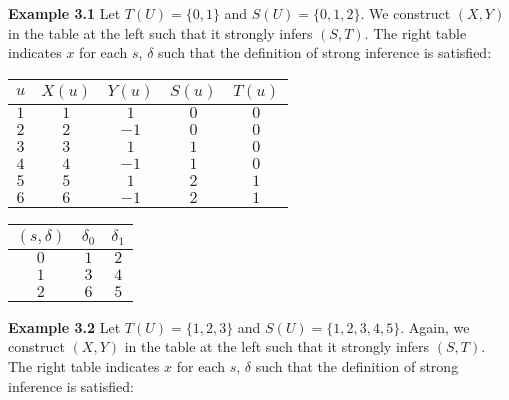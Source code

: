 \documentclass[11pt]{article}
\begin{document}
 
 \textbf{Example 3.1} \quad Let $ T(U) = \{0 , 1\} $ and $ S(U) = \{0, 1, 2\} $. We construct $ (X, Y) $ in the table at the left such that it strongly infers $ (S, T) $. The right table indicates $ x $ for each $ s $, $ \delta $ such that the definition of strong inference is satisfied: \\ 
 \begin {center}
 \begin{tabular}{ c||c|c|c|c } 

 $ u $ & $ X(u) $ & $ Y(u) $ & $ S(u) $ & $ T(u) $ \\ 
 \hline
 \hline
 $ 1 $ & $ 1 $ & $ 1 $ & $ 0 $ & $ 0 $ \\
 \hline
 $ 2 $ & $ 2 $ & $ -1 $ & $ 0 $ & $ 0 $ \\
 \hline
 $ 3 $ & $ 3 $ & $ 1 $ & $ 1 $ & $ 0 $ \\
 \hline
 $ 4 $ & $ 4 $ & $ -1 $ & $ 1 $ & $ 0 $ \\
 \hline 
 $ 5 $ & $ 5 $ & $ 1 $ & $ 2 $ & $ 1 $ \\
 \hline 
 $ 6 $ & $ 6 $ & $ -1 $ & $ 2 $ & $ 1 $ \\
 \end{tabular} 
 \quad 
 \begin{tabular}{ c||c|c } 

 $ (s, \delta) $ & $ \delta_0 $ & $ \delta_1 $ \\ 
 \hline
 \hline
 $ 0 $ & $ 1 $ & $ 2 $  \\
 \hline
 $ 1 $ & $ 3 $ & $ 4 $ \\
 \hline
 $ 2 $ & $ 6 $ & $ 5 $ \\
 
 \end{tabular}
 \end{center}
 
  
 \bigbreak
 \bigbreak 
 \textbf{Example 3.2} \quad Let $ T(U) = \{1, 2, 3\} $ and $ S(U) = \{1, 2, 3, 4, 5\} $. Again, we construct $ (X, Y) $ in the table at the left such that it strongly infers $ (S, T) $. The right table indicates $ x $ for each $ s $, $ \delta $ such that the definition of strong inference is satisfied: \\ 
\end{document}
